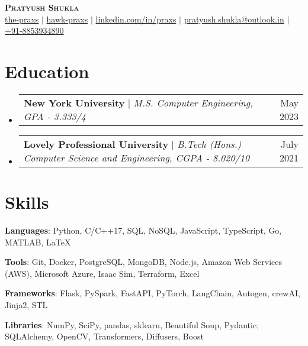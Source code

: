 \documentclass[letterpaper,11pt]{article}
\makeatletter
\newcommand{\resumeProjectHeading}[2]{
    \item
    \begin{tabular*}{0.97\textwidth}{l@{\extracolsep{\fill}}r}
      \small#1 & #2 \\
    \end{tabular*}\vspace{-7pt}
}
\newcommand{\resumeSubHeadingListStart}{\begin{itemize}[leftmargin=0.15in, label={}]}
\newcommand{\resumeSubHeadingListEnd}{\end{itemize}}
\makeatother
\begin{document}
\begin{center}
    \textbf{\Huge \scshape Pratyush Shukla} \\ \vspace{2pt}
    \small 
    \href{https://github.com/the-praxs}{the-praxs} $|$
    \href{https://github.com/hawk-praxs}{hawk-praxs} $|$
    \href{https://linkedin.com/in/praxs}{linkedin.com/in/praxs} $|$
    \href{mailto:pratyush.shukla@outlook.in}{pratyush.shukla@outlook.in} $|$
    \href{tel:+918853934890}{+91-8853934890}
\end{center}

\section{Education}
  \resumeSubHeadingListStart
  
        \resumeProjectHeading
        {\textbf{New York University} $|$ \footnotesize\emph{M.S. Computer Engineering, GPA - 3.333/4}}{May 2023}

        \resumeProjectHeading
        {\textbf{Lovely Professional University} $|$ \footnotesize\emph{B.Tech (Hons.) Computer Science and Engineering, CGPA - 8.020/10}}{July 2021}

  \resumeSubHeadingListEnd

\section{Skills}
 \begin{itemize}[leftmargin=0.15in, label={}]
    \small{\item{
     \textbf{Languages}{: Python, C/C++17, SQL, NoSQL, JavaScript, TypeScript, Go, MATLAB, \LaTeX}
     
     \textbf{Tools}{: Git, Docker, PostgreSQL, MongoDB, Node.js, Amazon Web Services (AWS), Microsoft Azure, Isaac Sim, Terraform, Excel}
     
     \textbf{Frameworks}{: Flask, PySpark, FastAPI, PyTorch, LangChain, Autogen, crewAI, Jinja2, STL}
     
     \textbf{Libraries}{: NumPy, SciPy, pandas, sklearn, Beautiful Soup, Pydantic, SQLAlchemy, OpenCV, Transformers, Diffusers, Boost}
     
    }}
 \end{itemize}
\end{document}
